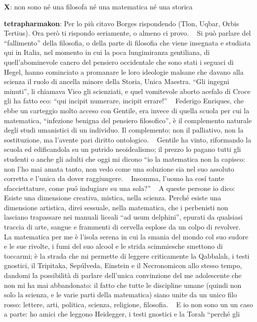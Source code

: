 \textbf{X}: non sono né una filosofa né una matematica né una storica

\textbf{tetrapharmakon}: Per lo più citavo Borges rispondendo (Tlon,
Uqbar, Orbis Tertius). Ora però ti rispondo seriamente, o almeno ci
provo. ~ Si può parlare del ``fallimento'' della filosofia, o della
parte di filosofia che viene insegnata e studiata qui in Italia, nel
momento in cui la poca lungimiranza gentiliana, di quell'abominevole
cancro del pensiero occidentale che sono stati i seguaci di Hegel, hanno
cominciato a promanare le loro ideologie malsane che davano alla scienza
il ruolo di ancella minore della Storia, Unica Maestra. ``Gli ingegni
minuti'', li chiamava Vico gli scienziati, e quel vomitevole aborto
acefalo di Croce gli ha fatto eco: ``qui incipit numerare, incipit
errare!'' ~ Federigo Enriques, che ebbe un carteggio molto acceso con
Gentile, era invece di quella scuola per cui la matematica, ``infezione
benigna del pensiero filosofico'', è il complemento naturale degli studi
umanistici di un individuo. Il complemento: non il palliativo, non la
sostituzione, ma l'avente pari diritto ontologico. ~ Gentile ha vinto,
riformando la scuola ed edificandola su un putrido neoidealismo; il
prezzo lo pagano tutti gli studenti o anche gli adulti che oggi mi
dicono ``io la matematica non la capisco: non l'ho mai amata tanto, non
vedo come una soluzione sia nel suo assoluto corretta e l'unica da dover
raggiungere. ~ Insomma, l'uomo ha cosí tante sfacciettature, come puó
indugiare su una sola?'' ~ A queste persone io dico: ~ Esiste una
dimensione creativa, mistica, nella scienza. Perché esiste una
dimensione artistica, direi sessuale, nella matematica, che i perbenisti
non lasciano trapassare nei manuali liceali ``ad usum delphini'',
epurati da qualsiasi traccia di arte, sangue e frammenti di cervella
esplose da un colpo di revolver. ~ La matematica per me è l'isola serena
in cui la smania del mondo col suo sudore e le sue rivolte, i fumi del
suo alcool e le strida scimmiesche smettono di toccarmi; è la strada che
mi permette di leggere criticamente la Qabbalah, i testi gnostici, il
Tripitaka, Sepúlveda, Einstein e il Necronomicon allo stesso tempo,
dandomi la possibilità di parlare dell'unica convinzione del me
adolescente che non mi ha mai abbandonato: il fatto che tutte le
discipline umane (quindi non solo la scienza, e le varie parti della
matematica) siano unite da un unico filo rosso: lettere, arti, politica,
scienza, religione, filosofia. ~ E io non sono un un caso a parte: ho
amici che leggono Heidegger, i testi gnostici e la Torah ``perché gli
